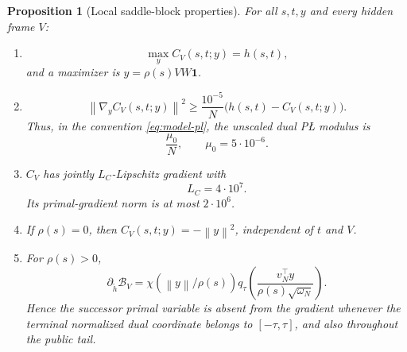 \documentclass[11pt,a4paper]{article}
\newcommand{\norm}[1]{\left\lVert #1\right\rVert}
\newcommand{\one}{\mathbf 1}
\newtheorem{proposition}[theorem]{Proposition}
\theoremstyle{definition}
\theoremstyle{remark}
\numberwithin{equation}{section}
\begin{document}
\begin{proposition}[Local saddle-block properties]
\label{prop:local-block}
For all $s,t,y$ and every hidden frame $V$:
\begin{enumerate}
\item
\begin{equation}
 \max_yC_V(s,t;y)=h(s,t),
 \label{eq:local-value}
\end{equation}
and a maximizer is $y=\rho(s)VW\one$.
\item
\begin{equation}
 \norm{\nabla_yC_V(s,t;y)}^2
 \ge\frac{10^{-5}}{N}\bigl(h(s,t)-C_V(s,t;y)\bigr).
 \label{eq:local-dual-pl}
\end{equation}
Thus, in the convention \eqref{eq:model-pl}, the unscaled dual P\L{} modulus is
\begin{equation}
 \frac{\mu_0}{N},
 \qquad \mu_0=5\cdot10^{-6}.
 \label{eq:mu0}
\end{equation}
\item $C_V$ has jointly $L_C$-Lipschitz gradient with
\begin{equation}
 L_C=4\cdot10^7.
 \label{eq:LC}
\end{equation}
Its primal-gradient norm is at most $2\cdot10^6$.
\item If $\rho(s)=0$, then $C_V(s,t;y)=-\norm y^2$, independent of $t$ and $V$.
\item For $\rho(s)>0$,
\begin{equation}
 \partial_{\widetilde h}\mathscr B_V
 =\chi(\norm y/\rho(s))
 q_\tau\!\left(
  \frac{v_N^\top y}{\rho(s)\sqrt{\omega_N}}
 \right).
 \label{eq:successor-gate}
\end{equation}
Hence the successor primal variable is absent from the gradient whenever the terminal normalized dual coordinate belongs to $[-\tau,\tau]$, and also throughout the public tail.
\end{enumerate}
\end{proposition}
\end{document}
